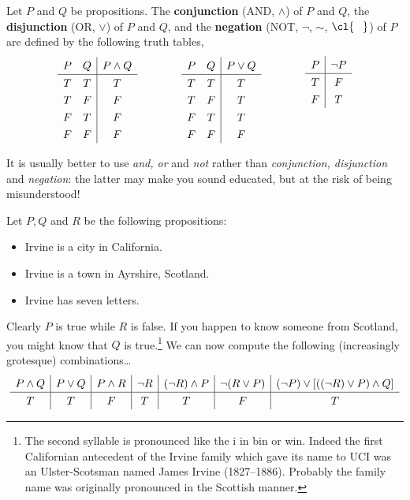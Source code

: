 \begin{defn}
Let $P$ and $Q$ be propositions. The \textbf{conjunction} (AND, $\wedge$) of $P$ and $Q$, the \textbf{disjunction} (OR, $\vee$) of $P$ and $Q$, and the \textbf{negation} (NOT, $\neg$, $\sim$, $\cl{\phantom{P}}$) of $P$ are defined by the following truth tables,
\[\begin{array}{cc|c}
P & Q & P\wedge Q\\\hline
T & T & T\\
T & F & F\\
F & T & F\\
F & F & F
\end{array}\qquad\qquad
\begin{array}{cc|c}
P & Q & P\vee Q\\\hline
T & T & T\\
T & F & T\\
F & T & T\\
F & F & F
\end{array}\qquad\qquad
\begin{array}[b]{c|c}
P & \neg P\\\hline
T & F\\
F & T
\end{array}\]
\end{defn}

\noindent It is usually better to use \emph{and, or} and \emph{not} rather than \emph{conjunction, disjunction} and \emph{negation}: the latter may make you sound educated, but at the risk of being misunderstood!

\begin{example}
Let $P,Q$ and $R$ be the following propositions:
\begin{itemize}
\item[] Irvine is a city in California.
\item[] Irvine is a town in Ayrshire, Scotland.
\item[] Irvine has seven letters.
\end{itemize}
Clearly $P$ is true while $R$ is false. If you happen to know someone from Scotland, you might know that $Q$ is true.\footnote{The second syllable is pronounced like the i in bin or win. Indeed the first Californian antecedent of the Irvine family which gave its name to UCI was an Ulster-Scotsman named James Irvine (1827--1886). Probably the family name was originally pronounced in the Scottish manner.} We can now compute the following (increasingly grotesque) combinations\ldots
\[\def\arraystretch{1.3}
\begin{array}{c|c|c|c|c|c|c}
P\wedge Q&P\vee Q&P\wedge R&\neg R&(\neg R)\wedge P&\neg(R\vee P)&(\neg P)\vee [((\neg R)\vee P)\wedge Q] \\\hline
T & T & F & T & T & F & T
\end{array}\]
\end{example}

